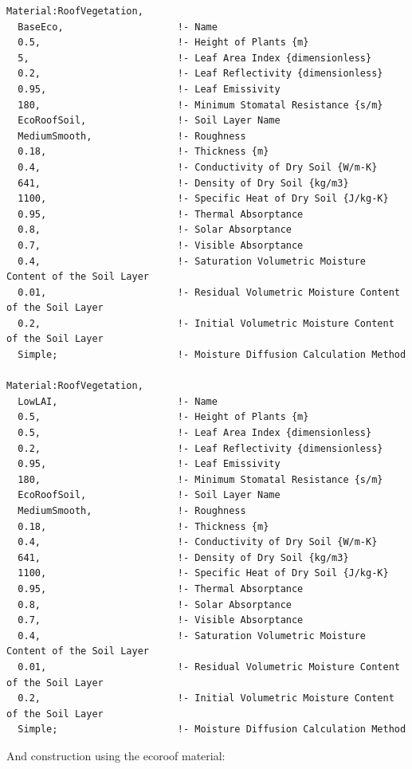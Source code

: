 \begin{lstlisting}
Material:RoofVegetation,
  BaseEco,                    !- Name
  0.5,                        !- Height of Plants {m}
  5,                          !- Leaf Area Index {dimensionless}
  0.2,                        !- Leaf Reflectivity {dimensionless}
  0.95,                       !- Leaf Emissivity
  180,                        !- Minimum Stomatal Resistance {s/m}
  EcoRoofSoil,                !- Soil Layer Name
  MediumSmooth,               !- Roughness
  0.18,                       !- Thickness {m}
  0.4,                        !- Conductivity of Dry Soil {W/m-K}
  641,                        !- Density of Dry Soil {kg/m3}
  1100,                       !- Specific Heat of Dry Soil {J/kg-K}
  0.95,                       !- Thermal Absorptance
  0.8,                        !- Solar Absorptance
  0.7,                        !- Visible Absorptance
  0.4,                        !- Saturation Volumetric Moisture Content of the Soil Layer
  0.01,                       !- Residual Volumetric Moisture Content of the Soil Layer
  0.2,                        !- Initial Volumetric Moisture Content of the Soil Layer
  Simple;                     !- Moisture Diffusion Calculation Method

Material:RoofVegetation,
  LowLAI,                     !- Name
  0.5,                        !- Height of Plants {m}
  0.5,                        !- Leaf Area Index {dimensionless}
  0.2,                        !- Leaf Reflectivity {dimensionless}
  0.95,                       !- Leaf Emissivity
  180,                        !- Minimum Stomatal Resistance {s/m}
  EcoRoofSoil,                !- Soil Layer Name
  MediumSmooth,               !- Roughness
  0.18,                       !- Thickness {m}
  0.4,                        !- Conductivity of Dry Soil {W/m-K}
  641,                        !- Density of Dry Soil {kg/m3}
  1100,                       !- Specific Heat of Dry Soil {J/kg-K}
  0.95,                       !- Thermal Absorptance
  0.8,                        !- Solar Absorptance
  0.7,                        !- Visible Absorptance
  0.4,                        !- Saturation Volumetric Moisture Content of the Soil Layer
  0.01,                       !- Residual Volumetric Moisture Content of the Soil Layer
  0.2,                        !- Initial Volumetric Moisture Content of the Soil Layer
  Simple;                     !- Moisture Diffusion Calculation Method
\end{lstlisting}

And construction using the ecoroof material:

